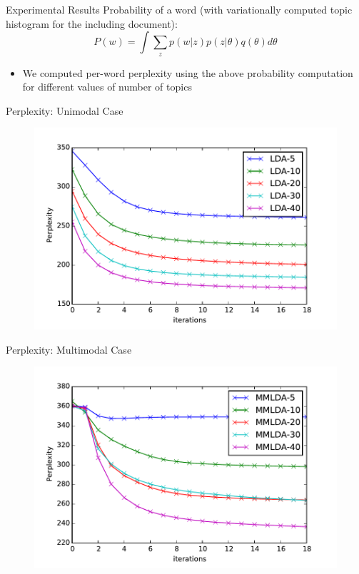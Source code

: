 \documentclass[pdf]{beamer}
\begin{document}
\begin{frame}{Experimental Results}
	Probability of a word (with variationally computed topic histogram for the including document):
	\begin{equation*}
	 	P(w) = \int \sum_z p(w|z) p(z|\theta)q(\theta)d\theta
	\end{equation*}
	\begin{itemize}
		\item We computed per-word perplexity using the above probability computation for different values of number of topics
	\end{itemize}
	
\end{frame}

\begin{frame}{Perplexity: Unimodal Case}
\begin{figure}
\label{fig:perpuni}
\includegraphics*[width=\textwidth]{perplex-uni.pdf}
\end{figure}
\end{frame}

\begin{frame}{Perplexity: Multimodal Case}
\begin{figure}
\label{fig:perpmulti}
\includegraphics*[width=\textwidth]{perplex-mm.pdf}
\end{figure}
\end{frame}
\end{document}
